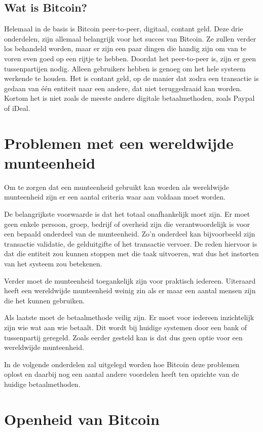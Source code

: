 \documentclass[a4paper]{article}
\begin{document}
\subsection{Wat is Bitcoin?}
Helemaal in de basis is Bitcoin peer-to-peer, digitaal, contant geld.
\cite[p1]{nakamoto2008bitcoin} Deze drie onderdelen, zijn allemaal belangrijk
voor het succes van Bitcoin. Ze zullen verder los behandeld worden, maar er
zijn een paar dingen die handig zijn om van te voren even goed op een rijtje te
hebben. Doordat het peer-to-peer is, zijn er geen tussenpartijen nodig. Alleen
gebruikers hebben is genoeg om het hele systeem werkende te houden. Het is
contant geld, op de manier dat zodra een transactie is gedaan van \'e\'en
entiteit naar een andere, dat niet teruggedraaid kan worden. Kortom het is niet
zoals de meeste andere digitale betaalmethoden, zoals Paypal of iDeal.

\section{Problemen met een wereldwijde munteenheid}
Om te zorgen dat een munteenheid gebruikt kan worden als wereldwijde
munteenheid zijn er een aantal criteria waar aan voldaan moet worden.

De belangrijkste voorwaarde is dat het totaal onafhankelijk moet zijn. Er moet
geen enkele persoon, groep, bedrijf of overheid zijn die verantwoordelijk is
voor een bepaald onderdeel van de munteenheid. Zo'n onderdeel kan bijvoorbeeld
zijn transactie validatie, de gelduitgifte of het transactie vervoer. De reden
hiervoor is dat die entiteit zou kunnen stoppen met die taak uitvoeren, wat dus
het instorten van het systeem zou betekenen.

Verder moet de munteenheid toegankelijk zijn voor praktisch iedereen. Uiteraard
heeft een wereldwijde munteenheid weinig zin als er maar een aantal mensen zijn
die het kunnen gebruiken.

Als laatste moet de betaalmethode veilig zijn. Er moet voor iedereen
inzichtelijk zijn wie wat aan wie betaalt. Dit wordt bij huidige systemen door
een bank of tussenpartij geregeld. Zoals eerder gesteld kan is dat dus geen
optie voor een wereldwijde munteenheid.

In de volgende onderdelen zal uitgelegd worden hoe Bitcoin deze problemen oplost
en daarbij nog een aantal andere voordelen heeft ten opzichte van de huidige
betaalmethoden.


\section{Openheid van Bitcoin}
\end{document}
